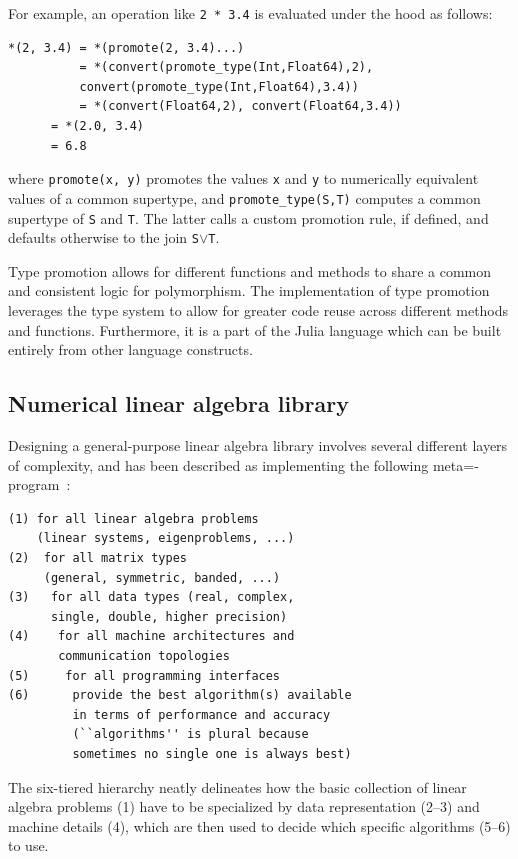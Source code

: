 \documentclass[10pt, preprint]{sigplanconf}
\begin{document}
For example, an operation like \verb|2 * 3.4| is evaluated under the hood as
follows:

\begin{lstlisting}
*(2, 3.4) = *(promote(2, 3.4)...)
          = *(convert(promote_type(Int,Float64),2),
	      convert(promote_type(Int,Float64),3.4))
          = *(convert(Float64,2), convert(Float64,3.4))
	  = *(2.0, 3.4)
	  = 6.8
\end{lstlisting}
%
where \verb|promote(x, y)| promotes the values \verb|x| and \verb|y| to
numerically equivalent values of a common supertype, and
\verb|promote_type(S,T)| computes a common supertype of \verb|S| and \verb|T|.
The latter calls a custom promotion rule, if defined, and defaults otherwise to
the join \verb|S|$\vee$\verb|T|.

Type promotion allows for different functions and methods to share a common and
consistent logic for polymorphism. The implementation of type promotion
leverages the type system to allow for greater code reuse across different
methods and functions. Furthermore, it is a part of the Julia language which
can be built entirely from other language constructs.


\subsection{Numerical linear algebra library}

Designing a general-purpose linear algebra library involves several different
layers of complexity, and has been described as implementing the following
meta=-program~\cite{Demmel2007}:

{\small
\begin{verbatim}
(1) for all linear algebra problems
    (linear systems, eigenproblems, ...)
(2)  for all matrix types
     (general, symmetric, banded, ...)
(3)   for all data types (real, complex,
      single, double, higher precision)
(4)    for all machine architectures and
       communication topologies
(5)     for all programming interfaces
(6)      provide the best algorithm(s) available
         in terms of performance and accuracy
         (``algorithms'' is plural because
         sometimes no single one is always best)
\end{verbatim}
}
%
The six-tiered hierarchy neatly delineates how the basic collection of linear
algebra problems (1) have to be specialized by data representation (2--3) and
machine details (4), which are then used to decide which specific algorithms
(5--6) to use.
\end{document}
